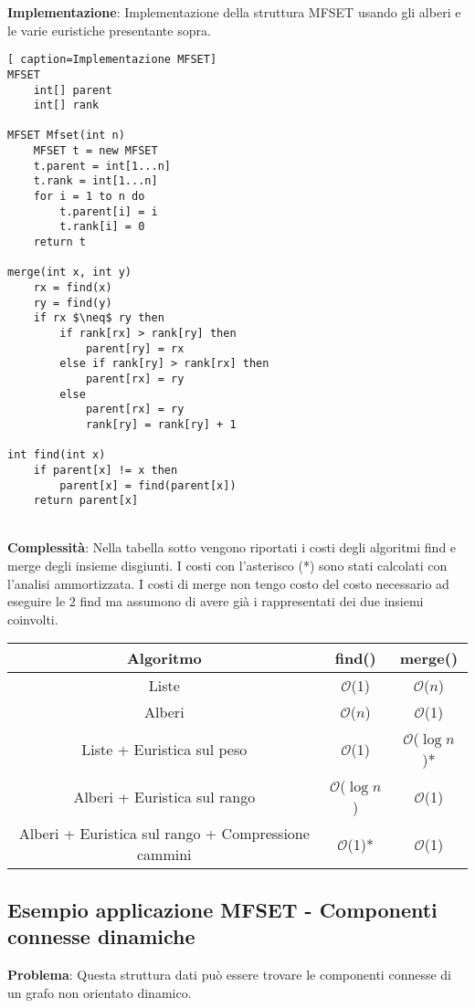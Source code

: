 \documentclass[../cheatSheetAlgoritmi.tex]{subfiles}
\begin{document}
\bigskip

\textbf{Implementazione}: Implementazione della struttura MFSET usando gli alberi e le varie euristiche presentante sopra.
\begin{lstlisting}[ caption=Implementazione MFSET]
MFSET
	int[] parent
	int[] rank
	
MFSET Mfset(int n)
	MFSET t = new MFSET
	t.parent = int[1...n]
	t.rank = int[1...n]
	for i = 1 to n do
		t.parent[i] = i
		t.rank[i] = 0
	return t
	
merge(int x, int y)
	rx = find(x)
	ry = find(y)
	if rx $\neq$ ry then
		if rank[rx] > rank[ry] then
			parent[ry] = rx
		else if rank[ry] > rank[rx] then
			parent[rx] = ry
		else
			parent[rx] = ry
			rank[ry] = rank[ry] + 1

int find(int x)
	if parent[x] != x then
		parent[x] = find(parent[x])
	return parent[x]
\end{lstlisting}
\textbf{\\Complessità}: Nella tabella sotto vengono riportati i costi degli algoritmi find e merge degli insieme disgiunti. I costi con l'asterisco (*) sono stati calcolati con l'analisi ammortizzata. I costi di merge non tengo costo del costo necessario ad eseguire le 2 find ma assumono di avere già i rappresentati dei due insiemi coinvolti.

\begin{center}
	\renewcommand{\arraystretch}{1.2}
	\begin{tabular}{ |c|c|c| } 
		\hline
			\textbf{Algoritmo} & find() & merge()\\ 
		\hline
			Liste & $\mathcal{O}$(1) &  $\mathcal{O}$($n$)\\ 
		\hline
			Alberi &  $\mathcal{O}$($n$) &  $\mathcal{O}$(1) \\
		\hline
			Liste + Euristica sul peso & $\mathcal{O}$(1) &  $\mathcal{O}$($\log n$)*\\
		\hline
			Alberi + Euristica sul rango & $\mathcal{O}$($\log n$) &  $\mathcal{O}$(1)\\
		\hline
			Alberi + Euristica sul rango + Compressione cammini & $\mathcal{O}$(1)* &  $\mathcal{O}$(1)\\
		\hline
	\end{tabular}
\end{center}
 
\subsection[Componenti connesse dinamiche]{Esempio applicazione MFSET - Componenti connesse dinamiche}
\textbf{Problema}: Questa struttura dati può essere trovare le componenti connesse di un grafo non orientato dinamico.
\end{document}
